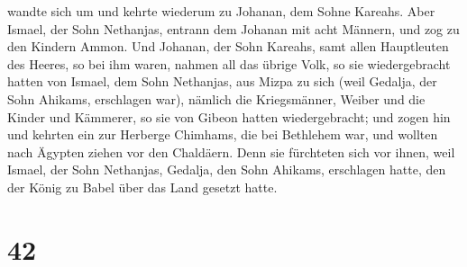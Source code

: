 wandte sich um und kehrte wiederum zu Johanan, dem Sohne Kareahs.
 Aber Ismael, der Sohn Nethanjas, entrann dem Johanan mit
acht Männern, und zog zu den Kindern Ammon.  Und Johanan,
der Sohn Kareahs, samt allen Hauptleuten des Heeres, so bei ihm waren,
nahmen all das übrige Volk, so sie wiedergebracht hatten von Ismael, dem
Sohn Nethanjas, aus Mizpa zu sich (weil Gedalja, der Sohn Ahikams,
erschlagen war), nämlich die Kriegsmänner, Weiber und die Kinder und
Kämmerer, so sie von Gibeon hatten wiedergebracht;  und
zogen hin und kehrten ein zur Herberge Chimhams, die bei Bethlehem war,
und wollten nach Ägypten ziehen vor den Chaldäern.  Denn
sie fürchteten sich vor ihnen, weil Ismael, der Sohn Nethanjas, Gedalja,
den Sohn Ahikams, erschlagen hatte, den der König zu Babel über das Land
gesetzt hatte.

\hypertarget{section-41}{%
\section{42}\label{section-41}}

